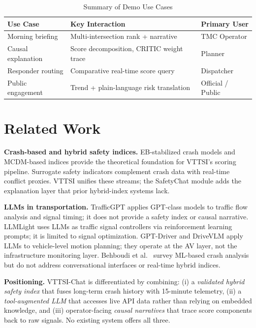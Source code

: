 \documentclass[conference]{IEEEtran}
\begin{document}
\begin{table}[t]
\centering
\caption{Summary of Demo Use Cases}
\label{tbl:usecases}
\small
\begin{tabularx}{\columnwidth}{@{}l X l@{}}
\toprule
\textbf{Use Case} & \textbf{Key Interaction} & \textbf{Primary User} \\
\midrule
Morning briefing        & Multi-intersection rank + narrative         & TMC Operator \\
Causal explanation      & Score decomposition, CRITIC weight trace    & Planner \\
Responder routing       & Comparative real-time score query           & Dispatcher \\
Public engagement       & Trend + plain-language risk translation     & Official / Public \\
\bottomrule
\end{tabularx}
\end{table}

\section{Related Work}
\label{sec:related}

\textbf{Crash-based and hybrid safety indices.}
EB-stabilized crash models \cite{persaud2007,montella2020systemic} and MCDM-based
indices \cite{Amraji2025CombinedSafetyIndex,asadamraji2025combined} provide the
theoretical foundation for VTTSI's scoring pipeline. Surrogate safety indicators
\cite{schultz2025_surrogate,gettman2003ssam} complement crash data with real-time
conflict proxies. VTTSI unifies these streams; the SafetyChat module adds the
explanation layer that prior hybrid-index systems lack.

\textbf{LLMs in transportation.}
TrafficGPT \cite{trafficgpt2023} applies GPT-class models to traffic flow analysis and
signal timing; it does not provide a safety index or causal narrative.
LLMLight \cite{llmlight2024} uses LLMs as traffic signal controllers via reinforcement
learning prompts; it is limited to signal optimization.
GPT-Driver \cite{gptdriver2023} and DriveVLM \cite{drivevlm2024} apply LLMs to
vehicle-level motion planning; they operate at the AV layer, not the infrastructure
monitoring layer.
Behboudi et al.\ \cite{Behboudi2024} survey ML-based crash analysis but do not address
conversational interfaces or real-time hybrid indices.

\textbf{Positioning.}
VTTSI-Chat is differentiated by combining: (i) a \emph{validated hybrid safety index}
that fuses long-term crash history with 15-minute telemetry, (ii) a
\emph{tool-augmented LLM} that accesses live API data rather than relying on embedded
knowledge, and (iii) operator-facing \emph{causal narratives} that trace score
components back to raw signals. No existing system offers all three.
\end{document}
